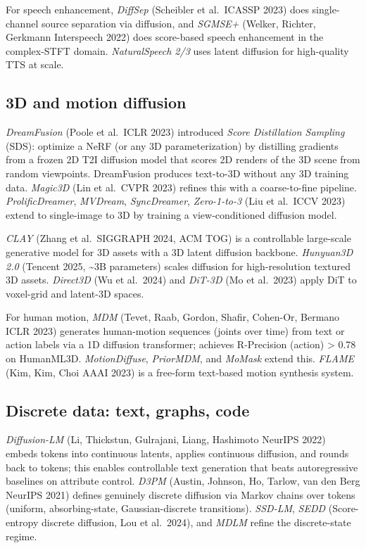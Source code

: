 For speech enhancement, \emph{DiffSep} (Scheibler et al.~ICASSP 2023) does single-channel source separation via diffusion, and \emph{SGMSE+} (Welker, Richter, Gerkmann Interspeech 2022) does score-based speech enhancement in the complex-STFT domain. \emph{NaturalSpeech 2/3} uses latent diffusion for high-quality TTS at scale.

\subsection{3D and motion diffusion}\label{d-and-motion-diffusion}

\emph{DreamFusion} (Poole et al.~ICLR 2023) introduced \emph{Score Distillation Sampling} (SDS): optimize a NeRF (or any 3D parameterization) by distilling gradients from a frozen 2D T2I diffusion model that scores 2D renders of the 3D scene from random viewpoints. DreamFusion produces text-to-3D without any 3D training data. \emph{Magic3D} (Lin et al.~CVPR 2023) refines this with a coarse-to-fine pipeline. \emph{ProlificDreamer}, \emph{MVDream}, \emph{SyncDreamer}, \emph{Zero-1-to-3} (Liu et al.~ICCV 2023) extend to single-image to 3D by training a view-conditioned diffusion model.

\emph{CLAY} (Zhang et al.~SIGGRAPH 2024, ACM TOG) is a controllable large-scale generative model for 3D assets with a 3D latent diffusion backbone. \emph{Hunyuan3D 2.0} (Tencent 2025, \textasciitilde3B parameters) scales diffusion for high-resolution textured 3D assets. \emph{Direct3D} (Wu et al.~2024) and \emph{DiT-3D} (Mo et al.~2023) apply DiT to voxel-grid and latent-3D spaces.

For human motion, \emph{MDM} (Tevet, Raab, Gordon, Shafir, Cohen-Or, Bermano ICLR 2023) generates human-motion sequences (joints over time) from text or action labels via a 1D diffusion transformer; achieves R-Precision (action) \textgreater{} 0.78 on HumanML3D. \emph{MotionDiffuse}, \emph{PriorMDM}, and \emph{MoMask} extend this. \emph{FLAME} (Kim, Kim, Choi AAAI 2023) is a free-form text-based motion synthesis system.

\subsection{Discrete data: text, graphs, code}\label{discrete-data-text-graphs-code}

\emph{Diffusion-LM} (Li, Thickstun, Gulrajani, Liang, Hashimoto NeurIPS 2022) embeds tokens into continuous latents, applies continuous diffusion, and rounds back to tokens; this enables controllable text generation that beats autoregressive baselines on attribute control. \emph{D3PM} (Austin, Johnson, Ho, Tarlow, van den Berg NeurIPS 2021) defines genuinely discrete diffusion via Markov chains over tokens (uniform, absorbing-state, Gaussian-discrete transitions). \emph{SSD-LM}, \emph{SEDD} (Score-entropy discrete diffusion, Lou et al.~2024), and \emph{MDLM} refine the discrete-state regime.

